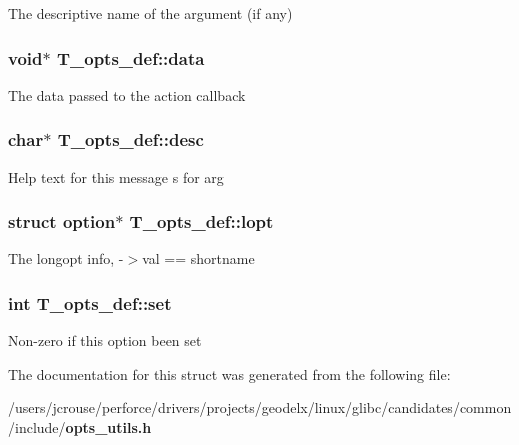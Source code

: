 The descriptive name of the argument (if any) 
\subsubsection{\setlength{\rightskip}{0pt plus 5cm}void$\ast$ T\_\-opts\_\-def::data}\label{structT__opts__def_m3}


The data passed to the action callback 
\subsubsection{\setlength{\rightskip}{0pt plus 5cm}char$\ast$ T\_\-opts\_\-def::desc}\label{structT__opts__def_m4}


Help text for this message s for arg 
\subsubsection{\setlength{\rightskip}{0pt plus 5cm}struct option$\ast$ T\_\-opts\_\-def::lopt}\label{structT__opts__def_m5}


The longopt info, -$>$val == shortname 
\subsubsection{\setlength{\rightskip}{0pt plus 5cm}int T\_\-opts\_\-def::set}\label{structT__opts__def_m0}


Non-zero if this option been set 

The documentation for this struct was generated from the following file:\begin{CompactItemize}
\item 
/users/jcrouse/perforce/drivers/projects/geodelx/linux/glibc/candidates/common/include/{\bf opts\_\-utils.h}\end{CompactItemize}
